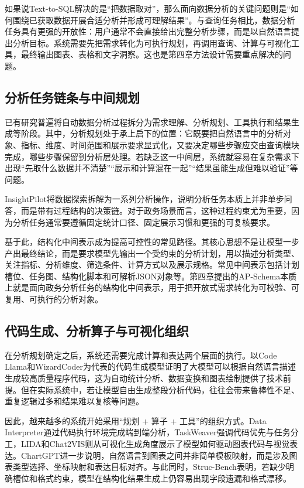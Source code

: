如果说Text-to-SQL解决的是“把数据取对”，那么面向数据分析的关键问题则是“如何围绕已获取数据开展合适分析并形成可理解结果”。与查询任务相比，数据分析任务具有更强的开放性：用户通常不会直接给出完整分析步骤，而是以自然语言提出分析目标。系统需要先把需求转化为可执行规划，再调用查询、计算与可视化工具，最终输出图表、表格和文字洞察\cite{hong2024datainterpreter,ma2023insightpilot}。这也是第四章方法设计需要重点解决的问题。

\subsection{分析任务链条与中间规划}

已有研究普遍将自动数据分析过程拆分为需求理解、分析规划、工具执行和结果生成等阶段\cite{ma2023insightpilot,hong2024datainterpreter}。其中，分析规划处于承上启下的位置：它既要把自然语言中的分析对象、指标、维度、时间范围和展示要求显式化，又要决定哪些步骤应交由查询模块完成，哪些步骤保留到分析层处理。若缺乏这一中间层，系统就容易在复杂需求下出现“先取什么数据并不清楚”“展示和计算混在一起”“结果虽能生成但难以验证”等问题。

InsightPilot\cite{ma2023insightpilot}将数据探索拆解为一系列分析操作，说明分析任务本质上并非单步问答，而是带有过程结构的决策链。对于政务场景而言，这种过程约束尤为重要，因为分析任务通常要遵循固定统计口径、固定展示习惯和更强的可复核要求\cite{王昀2024,王薇2025}。

基于此，结构化中间表示成为提高可控性的常见路径。其核心思想不是让模型一步产出最终结论，而是要求模型先输出一个受约束的分析计划，用以描述分析类型、关注指标、分析维度、筛选条件、计算方式以及展示规格。常见中间表示包括计划槽位、任务图、结构化脚本和可解析JSON对象等。第四章提出的AP-Schema本质上就是面向政务分析任务的结构化中间表示，用于把开放式需求转化为可校验、可复用、可执行的分析对象。

\subsection{代码生成、分析算子与可视化组织}

在分析规划确定之后，系统还需要完成计算和表达两个层面的执行。以Code Llama\cite{roziere2023codellama}和WizardCoder\cite{luo2023wizardcoder}为代表的代码生成模型证明了大模型可以根据自然语言描述生成较高质量程序代码，这为自动统计分析、数据变换和图表绘制提供了技术前提。但在实际系统中，若让模型自由生成整段分析代码，往往会带来鲁棒性不足、重复逻辑过多和结果难以复核等问题。

因此，越来越多的系统开始采用“规划 + 算子 + 工具”的组织方式。Data Interpreter\cite{hong2024datainterpreter}通过代码执行环境完成端到端分析，TaskWeaver\cite{qin2024taskweaver}强调代码优先与任务分工，LIDA\cite{dibia2023lida}和Chat2VIS\cite{maddigan2023chat2vis}则从可视化生成角度展示了模型如何驱动图表代码与视觉表达。ChartGPT\cite{tian2024chartgpt}进一步说明，自然语言到图表之间并非简单模板映射，而是涉及图表类型选择、坐标映射和表达目标对齐。与此同时，Struc-Bench表明，若缺少明确槽位和格式约束，模型在结构化结果生成上仍容易出现字段遗漏和格式漂移\cite{tang2024struc}。

